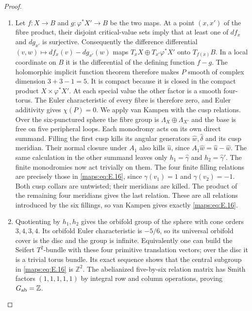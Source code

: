 \documentclass[11pt,a4paper]{article}
\numberwithin{equation}{section}
\theoremstyle{definition}
\begin{document}
\begin{proof}
\begin{enumerate}[label=\arabic*.,leftmargin=*]
\item Let $f:X\to B$ and $g:\varphi^*X'\to B$ be the two maps.
At a point $(x,x')$ of the fibre product, their disjoint critical-value
sets imply that at least one of $df_x$ and $dg_{x'}$ is surjective.
Consequently the difference differential
$(v,w)\mapsto df_x(v)-dg_{x'}(w)$ maps
$T_xX\oplus T_{x'}\varphi^*X'$ onto $T_{f(x)}B$.
In a local coordinate on $B$ it is the differential of the defining
function $f-g$. The holomorphic implicit function theorem therefore
makes $P$ smooth of complex dimension $3+3-1=5$.
It is compact because it is closed in the compact product
$X\times\varphi^*X'$.  At each special value the other
factor is a smooth four-torus.  The Euler characteristic of every
fibre is therefore zero, and Euler additivity gives $\chi(P)=0$.
We apply van Kampen with the cusp relations.
Over the six-punctured sphere the fibre group is
$\Lambda_X\oplus\Lambda_{X'}$ and the base is free on five
peripheral loops.  Each monodromy acts on its own direct summand.
Filling the first cusp kills its angular generators
$\widehat w,\widehat\delta$ and its cusp meridian.  Their normal
closure under $A_1$ also kills $\widehat u$, since
$A_1\widehat w=\widehat u-\widehat w$.  The same calculation
in the other summand leaves only $h_1=\widehat\gamma$ and
$h_2=\widehat\gamma'$.  The finite monodromies now act trivially
on them.  The four finite filling relations are precisely those
in \eqref{maps:eq:E.16}, since $\gamma(v_1)=1$ and $\gamma(v_2)=-1$.
Both cusp collars are untwisted; their meridians are killed.
The product of the remaining four meridians gives the last
relation.  These are all relations introduced by the six
fillings, so van Kampen gives exactly \eqref{maps:eq:E.16}.

\item Quotienting by $h_1,h_2$ gives the orbifold group of the sphere
with cone orders $3,4,3,4$.  Its orbifold Euler characteristic
is $-5/6$, so its universal orbifold cover is the disc and the
group is infinite.  Equivalently one can build the Seifert
$T^2$-bundle with these four primitive translation vectors; over
the disc it is a trivial torus bundle.  Its exact sequence shows
that the central subgroup in \eqref{maps:eq:E.16} is $\mathbb Z^2$.
The abelianized five-by-six relation matrix has Smith factors
$(1,1,1,1,1)$ by integral row and column operations, proving $G_{\rm ab}=\mathbb Z$.


\end{enumerate}
\end{proof}
\end{document}
